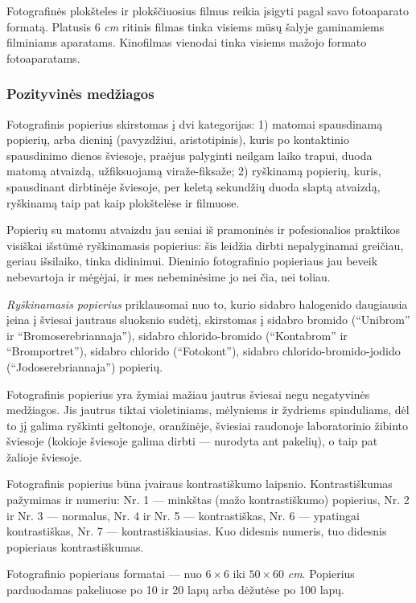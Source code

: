 \documentclass{book}
\begin{document}
					Fotografinės plokšteles ir plokščiuosius filmus reikia įsigyti pagal savo fotoaparato formatą. Platusis 6 \textit{cm} ritinis filmas tinka visiems mūsų šalyje gaminamiems filminiams aparatams. Kinofilmas vienodai tinka visiems mažojo formato fotoaparatams.
				\subsubsection*{Pozityvinės medžiagos}
					Fotografinis popierius skirstomas į dvi kategorijas: 1) matomai spausdinamą popierių, arba dieninį (pavyzdžiui, aristotipinis), kuris po kontaktinio spausdinimo dienos šviesoje, praėjus palyginti neilgam laiko trapui, duoda matomą atvaizdą, užfiksuojamą viraže-fiksaže; 2) ryškinamą popierių, kuris, spausdinant dirbtinėje šviesoje, per keletą sekundžių duoda slaptą atvaizdą, ryškinamą taip pat kaip plokštelėse ir filmuose.

					Popierių su matomu atvaizdu jau seniai iš pramoninės ir pofesionalios praktikos visiškai išstūmė ryškinamasis popierius: šis leidžia dirbti nepalyginamai greičiau, geriau išsilaiko, tinka didinimui. Dieninio fotografinio popieriaus jau beveik nebevartoja ir mėgėjai, ir mes nebeminėsime jo nei čia, nei toliau.

					\textit{Ryškinamasis popierius} priklausomai nuo to, kurio sidabro halogenido daugiausia įeina į šviesai jautraus sluoksnio sudėtį, skirstomas į sidabro bromido (``Unibrom'' ir ``Bromoserebriannaja''), sidabro chlorido-bromido (``Kontabrom'' ir ``Bromportret''), sidabro chlorido (``Fotokont''), sidabro chlorido-bromido-jodido (``Jodoserebriannaja'') popierių.

					Fotografinis popierius yra žymiai mažiau jautrus šviesai negu negatyvinės medžiagos. Jis jautrus tiktai violetiniams, mėlyniems ir žydriems spinduliams, dėl to jį galima ryškinti geltonoje, oranžinėje, šviesiai raudonoje laboratorinio žibinto šviesoje (kokioje šviesoje galima dirbti --- nurodyta ant pakelių), o taip pat žalioje šviesoje.

					Fotografinis popierius būna įvairaus kontrastiškumo laipsnio. Kontrastiškumas pažymimas ir numeriu: Nr. 1 --- minkštas (mažo kontrastiškumo) popierius, Nr. 2 ir Nr. 3 --- normalus, Nr. 4 ir Nr. 5 --- kontrastiškas, Nr. 6 --- ypatingai kontrastiškas, Nr. 7 --- kontrastiškiausias. Kuo didesnis numeris, tuo didesnis popieriaus kontrastiškumas.

					Fotografinio popieriaus formatai --- nuo $6 \times 6$ iki $50 \times 60$ \textit{cm}. Popierius parduodamas pakeliuose po 10 ir 20 lapų arba dėžutėse po 100 lapų.
\end{document}
